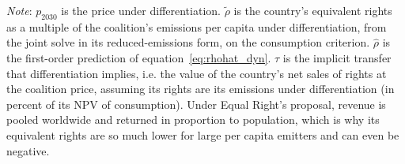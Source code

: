 \documentclass[12pt,english]{article}
\theoremstyle{remark}
\begin{document}
\begin{table}[!ht]
\centering
\small
\singlespacing
\caption{Equivalent rights of three differentiated-price schedules, and the surplus of a uniform price.}
\label{tab:equiv_rights_main}
\begin{minipage}{\textwidth}\footnotesize\singlespacing
\emph{Note}: %
$p_{2030}$ is the price under differentiation. %
$\tilde\rho$ is the country's equivalent rights as a multiple of the coalition's emissions per capita under differentiation, from the joint solve in its reduced-emissions form, %
on the consumption criterion. %
$\hat\rho$ is the first-order prediction of equation~\eqref{eq:rhohat_dyn}. $\tau$ is the implicit transfer that differentiation implies, i.e. the value of the country's net sales of rights at the coalition price, assuming its rights are its emissions under differentiation (in percent of its NPV of consumption). %
Under Equal Right's proposal, revenue is pooled worldwide and returned in proportion to population, which is why its equivalent rights are so much lower for large per capita emitters and can even be negative. 

\end{minipage}
\end{table}
\end{document}
